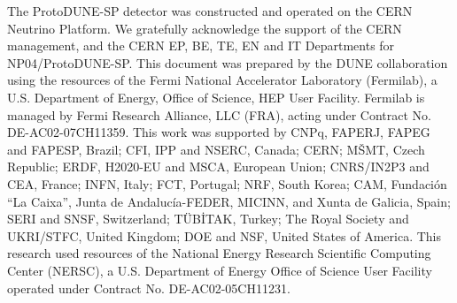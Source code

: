 
% 



%
%
The ProtoDUNE-SP detector was constructed and operated on the CERN Neutrino Platform.
We gratefully acknowledge the support of the CERN management, and the
CERN EP, BE, TE, EN and IT Departments for NP04/Proto\-DUNE-SP.
%
%
This document was prepared by the DUNE collaboration using the
resources of the Fermi National Accelerator Laboratory 
(Fermilab), a U.S. Department of Energy, Office of Science, 
HEP User Facility. Fermilab is managed by Fermi Research Alliance, 
LLC (FRA), acting under Contract No. DE-AC02-07CH11359.
%
%
This work was supported by
CNPq,
FAPERJ,
FAPEG and 
FAPESP,                         Brazil;
CFI, 
IPP and 
NSERC,                          Canada;
CERN;
M\v{S}MT,                       Czech Republic;
ERDF, 
H2020-EU and 
MSCA,                           European Union;
CNRS/IN2P3 and
CEA,                            France;
INFN,                           Italy;
FCT,                            Portugal;
NRF,                            South Korea;
CAM, 
Fundaci\'{o}n ``La Caixa'',
Junta de Andaluc\'ia-FEDER,
MICINN, and
Xunta de Galicia,               Spain;
SERI and 
SNSF,                           Switzerland;
T\"UB\.ITAK,                    Turkey;
The Royal Society and 
UKRI/STFC,                      United Kingdom;
DOE and 
NSF,                            United States of America.
%
%
This research used resources of the 
National Energy Research Scientific Computing Center (NERSC), 
a U.S. Department of Energy Office of Science User Facility 
operated under Contract No. DE-AC02-05CH11231.
%
%
